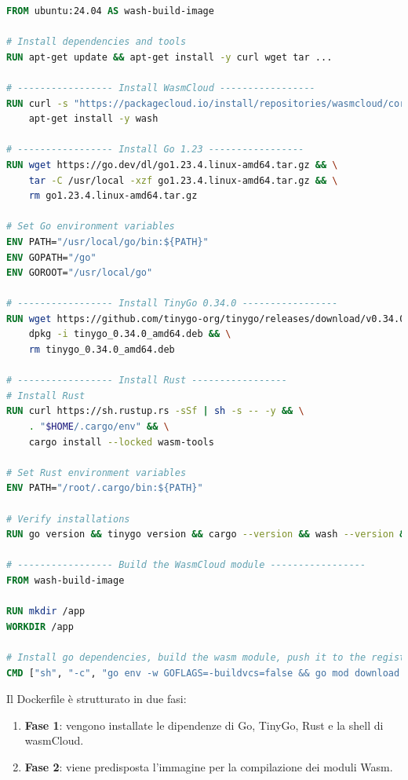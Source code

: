\begin{lstlisting}[language=Dockerfile, caption={wash-build-image Dockerfile}, captionpos=b, label={code:wash_buil_image_dockerfile}, basicstyle=\ttfamily\small]
FROM ubuntu:24.04 AS wash-build-image

# Install dependencies and tools
RUN apt-get update && apt-get install -y curl wget tar ...

# ----------------- Install WasmCloud -----------------
RUN curl -s "https://packagecloud.io/install/repositories/wasmcloud/core/script.deb.sh" | bash && \
    apt-get install -y wash

# ----------------- Install Go 1.23 -----------------    
RUN wget https://go.dev/dl/go1.23.4.linux-amd64.tar.gz && \
    tar -C /usr/local -xzf go1.23.4.linux-amd64.tar.gz && \
    rm go1.23.4.linux-amd64.tar.gz

# Set Go environment variables
ENV PATH="/usr/local/go/bin:${PATH}"
ENV GOPATH="/go"
ENV GOROOT="/usr/local/go"

# ----------------- Install TinyGo 0.34.0 -----------------
RUN wget https://github.com/tinygo-org/tinygo/releases/download/v0.34.0/tinygo_0.34.0_amd64.deb && \
    dpkg -i tinygo_0.34.0_amd64.deb && \
    rm tinygo_0.34.0_amd64.deb

# ----------------- Install Rust -----------------
# Install Rust
RUN curl https://sh.rustup.rs -sSf | sh -s -- -y && \
    . "$HOME/.cargo/env" && \
    cargo install --locked wasm-tools

# Set Rust environment variables
ENV PATH="/root/.cargo/bin:${PATH}"

# Verify installations
RUN go version && tinygo version && cargo --version && wash --version && wasm-tools --version

# ----------------- Build the WasmCloud module -----------------
FROM wash-build-image

RUN mkdir /app
WORKDIR /app

# Install go dependencies, build the wasm module, push it to the registry
CMD ["sh", "-c", "go env -w GOFLAGS=-buildvcs=false && go mod download && go mod verify && wash build && wash push $REGISTRY build/*.wasm && chown -R ${HOST_UID}:${HOST_GID} ."]
\end{lstlisting}

Il Dockerfile è strutturato in due fasi:
\begin{enumerate}
    \item \textbf{Fase 1}: vengono installate le dipendenze di Go, TinyGo, Rust e la shell di wasmCloud.
    \item \textbf{Fase 2}: viene predisposta l'immagine per la compilazione dei moduli Wasm.
\end{enumerate}

